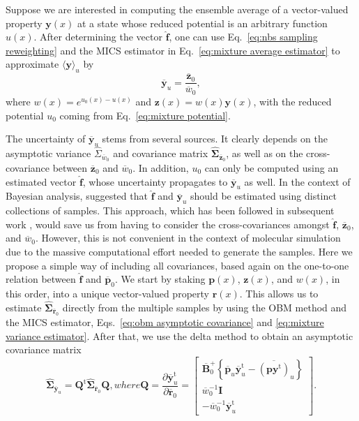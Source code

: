 \documentclass[
    journal=jctcce,
    layout=twocolumn
]{achemso}
\newcommand{\mt}[1]{\boldsymbol{\mathbf{#1}}}   %
\newcommand{\vt}[1]{\boldsymbol{\mathbf{#1}}}   %
\newcommand{\tr}[1]{#1^\text{t}}                %
\newcommand{\diff}[2]{\frac{\partial #2}{\partial #1}} %
\newcommand{\avg}[1]{\overline{#1}}             %
\begin{document}
Suppose we are interested in computing the ensemble average of a vector-valued property $\vt y(x)$ at a state whose reduced potential is an arbitrary function $u(x)$. After determining the vector $\hat{\vt f}$, one can use Eq.~\eqref{eq:nbs sampling reweighting} and the MICS estimator in Eq.~\eqref{eq:mixture average estimator} to approximate $\langle \vt y \rangle_u$ by
\begin{equation}
\label{eq:mics reweighting}
\avg{\vt y}_u = \frac{\avg{\vt z}_0}{\avg{w}_0},
\end{equation}
where $w(x) = e^{u_0(x) - u(x)}$ and ${\vt z}(x) = w(x) {\vt y}(x)$, with the reduced potential $u_0$ coming from Eq.~\eqref{eq:mixture potential}.

The uncertainty of $\avg{\vt y}_u$ stems from several sources. It clearly depends on the asymptotic variance $\hat \Sigma_{\avg w_0}$ and covariance matrix $\hat{\mt \Sigma}_{\avg{\vt z}_0}$, as well as on the cross-covariance between $\avg{\vt z}_0$ and $\avg w_0$. In addition, $u_0$ can only be computed using an estimated vector $\hat{\vt f}$, whose uncertainty propagates to $\avg{\vt y}_u$ as well. In the context of Bayesian analysis, \citeauthor{Buta_2011} \cite{Buta_2011} suggested that $\hat{\vt f}$ and $\avg{\vt y}_u$ should be estimated using distinct collections of samples. This approach, which has been followed in subsequent work \cite{Tan_2015, Roy_2018}, would save us from having to consider the cross-covariances amongst $\hat{\vt f}$, $\avg{\vt z}_0$, and $\avg w_0$. However, this is not convenient in the context of molecular simulation due to the massive computational effort needed to generate the samples. Here we propose a simple way of including all covariances, based again on the one-to-one relation between $\hat{\vt f}$ and $\avg{\vt p}_0$. We start by staking $\vt p(x)$, $\vt z(x)$, and $w(x)$, in this order, into a unique vector-valued property $\vt r(x)$. This allows us to estimate $\hat{\mt \Sigma}_{\avg{\vt r}_0}$ directly from the multiple samples by using the OBM method and the MICS estimator, Eqs.~\eqref{eq:obm asymptotic covariance} and \eqref{eq:mixture variance estimator}. After that, we use the delta method to obtain an asymptotic covariance matrix
\begin{subequations}
\label{eq:mics reweighting uncertainty}
\begin{equation}
\label{eq:mics reweighting delta method}
\hat{\mt \Sigma}_{\avg{\vt y}_u} = \tr{\mt Q} \hat{\mt \Sigma}_{\avg{\vt r}_0} {\mt Q},
\end{equation}
where
\begin{equation}
\label{eq:mics reweighting gradient}
{\mt Q} = \diff{\avg{\vt r}_0}{\tr{\avg{\vt y}}_u} = \left[\begin{array}{c}
\avg{\mt B}_0^+ \left\{ \avg{\vt p}_u \tr{\avg{\vt y}}_u - \avg{(\vt p \tr{\vt y})}_u\right\} \\
\avg{w}_0^{-1} {\mt I} \\
-\avg{w}_0^{-1} \tr{\avg{\vt y}}_u
\end{array}\right].
\end{equation}
\end{subequations}
\end{document}
